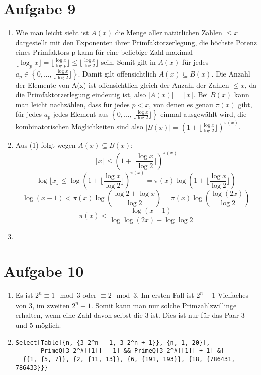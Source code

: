 \section*{Aufgabe 9}
\begin{enumerate}[(1)]

\item Wie man leicht sieht ist $A(x)$ die Menge aller natürlichen Zahlen $\leq x$ dargestellt mit den Exponenten ihrer Primfaktorzerlegung, die höchste Potenz eines Primfaktors p kann
für eine beliebige Zahl maximal $\lfloor \log_p x \rfloor= \lfloor \frac{\log x}{\log p} \rfloor  \leq \lfloor \frac{\log x}{\log 2} \rfloor $ sein. Somit gilt in $A(x)$ für jedes $a_p \in \left\{0, ..., \lfloor \frac{\log x}{\log 2} \rfloor \right\} $.
Damit gilt offensichtlich $A(x) \subseteq B(x)$. Die Anzahl der Elemente von A(x) ist offensichtlich gleich der Anzahl der Zahlen $\leq x$, da die Primfaktorzerlegung eindeutig ist, also $|A(x)| = \lfloor x \rfloor$.
Bei $B(x)$ kann man leicht nachzählen, dass für jedes $p < x$, von denen es genau $\pi(x)$ gibt, für jedes $a_p$ jedes Element aus $\left\{0, ..., \lfloor \frac{\log x}{\log 2} \rfloor \right\}$ einmal ausgewählt wird, die kombinatorischen Möglichkeiten sind also
$| B(x) | = \left(1 + \lfloor \frac{\log x}{\log 2} \rfloor \right)^{\pi(x)} $.


\item Aus (1) folgt wegen  $A(x) \subseteq B(x)$:
\[ \lfloor x \rfloor \leq  \left(1 + \lfloor \frac{\log x}{\log 2} \rfloor \right)^{\pi(x)} \]
\[ \log \lfloor x \rfloor \leq \log \left(1 + \lfloor \frac{\log x}{\log 2} \rfloor \right)^{\pi(x)} = \pi(x) \log \left(1 + \lfloor \frac{\log x}{\log 2} \rfloor \right) \]
\[ \log (x-1) <  \pi(x) \log \left(  \frac{\log 2 + \log x}{\log 2}  \right)  = \pi(x) \log \left(  \frac{\log (2x)}{\log 2}  \right) \] 
\[ \pi(x) < \frac{\log (x-1)}{\log \log (2x) - \log \log 2} \]


\item
\end{enumerate}


\section*{Aufgabe 10}

\begin{enumerate}[(1)]
\item Es ist $2^n \equiv 1 \mod 3$ oder $\equiv 2 \mod 3$. Im ersten Fall ist $2^n - 1$ Vielfaches von 3, im zweiten $2^n + 1$. Somit kann man nur solche Primzahlzwillinge erhalten, wenn eine Zahl davon selbst die 3 ist. Dies ist nur für das Paar 3 und 5 möglich.

\item 
\lstset{language=Mathematica}
\begin{lstlisting}
Select[Table[{n, {3 2^n - 1, 3 2^n + 1}}, {n, 1, 20}],   
       PrimeQ[3 2^#[[1]] - 1] && PrimeQ[3 2^#[[1]] + 1] &]
  {{1, {5, 7}}, {2, {11, 13}}, {6, {191, 193}}, {18, {786431, 786433}}}
\end{lstlisting}
\end{enumerate}
